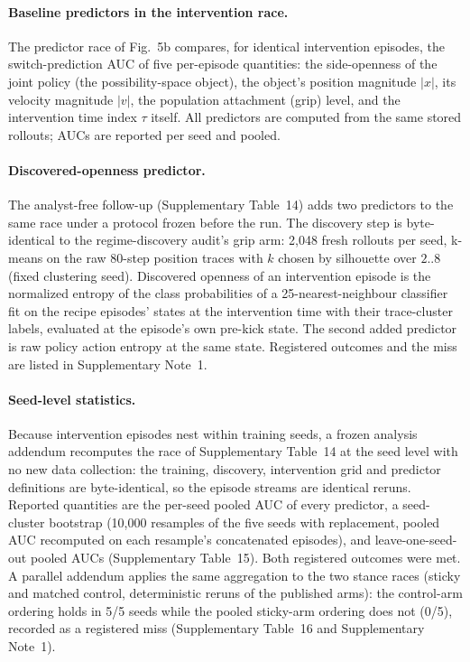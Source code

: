\documentclass[11pt]{article}
\begin{document}
\paragraph{Baseline predictors in the intervention race.}
The predictor race of Fig.~5b compares, for identical intervention
episodes, the switch-prediction AUC of five per-episode quantities:
the side-openness of the joint policy (the possibility-space object),
the object's position magnitude $|x|$, its velocity magnitude $|v|$,
the population attachment (grip) level, and the intervention time
index $\tau$ itself. All predictors are computed from the same stored
rollouts; AUCs are reported per seed and pooled.

\paragraph{Discovered-openness predictor.}
The analyst-free follow-up (Supplementary Table~14) adds two
predictors to the same race under a protocol frozen before the run.
The discovery step is byte-identical to the regime-discovery audit's
grip arm: 2{,}048 fresh rollouts per seed, k-means on the raw 80-step
position traces with $k$ chosen by silhouette over $2..8$
(fixed clustering seed). Discovered openness of an intervention
episode is the normalized entropy of the class probabilities of a
25-nearest-neighbour classifier fit on the recipe episodes' states at
the intervention time with their trace-cluster labels, evaluated at
the episode's own pre-kick state. The second added predictor is raw
policy action entropy at the same state. Registered outcomes and the
miss are listed in Supplementary Note~1.

\paragraph{Seed-level statistics.}
Because intervention episodes nest within training seeds, a frozen
analysis addendum recomputes the race of Supplementary Table~14 at
the seed level with no new data collection: the training, discovery,
intervention grid and predictor definitions are byte-identical, so
the episode streams are identical reruns. Reported quantities are the
per-seed pooled AUC of every predictor, a seed-cluster bootstrap
(10{,}000 resamples of the five seeds with replacement, pooled AUC
recomputed on each resample's concatenated episodes), and
leave-one-seed-out pooled AUCs (Supplementary Table~15). Both
registered outcomes were met. A parallel addendum applies the same
aggregation to the two stance races (sticky and matched control,
deterministic reruns of the published arms): the control-arm ordering
holds in 5/5 seeds while the pooled sticky-arm ordering does not
(0/5), recorded as a registered miss (Supplementary Table~16 and
Supplementary Note~1).
\end{document}
